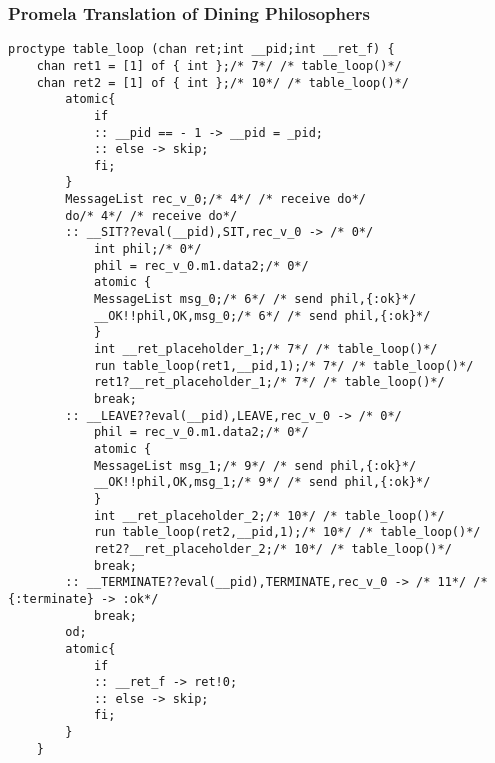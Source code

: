\subsubsection{Promela Translation of Dining Philosophers}
\begin{lstlisting}[xleftmargin=.001\linewidth, xrightmargin=0.001\linewidth, caption={Dining Philosophers Promela translation.}, label={lst:promela_dp}]
  proctype table_loop (chan ret;int __pid;int __ret_f) {
    chan ret1 = [1] of { int };/* 7*/ /* table_loop()*/ 
    chan ret2 = [1] of { int };/* 10*/ /* table_loop()*/ 
        atomic{
            if
            :: __pid == - 1 -> __pid = _pid;
            :: else -> skip;
            fi;
        }
        MessageList rec_v_0;/* 4*/ /* receive do*/ 
        do/* 4*/ /* receive do*/ 
        :: __SIT??eval(__pid),SIT,rec_v_0 -> /* 0*/ 
            int phil;/* 0*/ 
            phil = rec_v_0.m1.data2;/* 0*/ 
            atomic {
            MessageList msg_0;/* 6*/ /* send phil,{:ok}*/ 
            __OK!!phil,OK,msg_0;/* 6*/ /* send phil,{:ok}*/ 
            }
            int __ret_placeholder_1;/* 7*/ /* table_loop()*/ 
            run table_loop(ret1,__pid,1);/* 7*/ /* table_loop()*/ 
            ret1?__ret_placeholder_1;/* 7*/ /* table_loop()*/ 
            break;
        :: __LEAVE??eval(__pid),LEAVE,rec_v_0 -> /* 0*/ 
            phil = rec_v_0.m1.data2;/* 0*/ 
            atomic {
            MessageList msg_1;/* 9*/ /* send phil,{:ok}*/ 
            __OK!!phil,OK,msg_1;/* 9*/ /* send phil,{:ok}*/ 
            }
            int __ret_placeholder_2;/* 10*/ /* table_loop()*/ 
            run table_loop(ret2,__pid,1);/* 10*/ /* table_loop()*/ 
            ret2?__ret_placeholder_2;/* 10*/ /* table_loop()*/ 
            break;
        :: __TERMINATE??eval(__pid),TERMINATE,rec_v_0 -> /* 11*/ /* {:terminate} -> :ok*/ 
            break;
        od;
        atomic{
            if
            :: __ret_f -> ret!0;
            :: else -> skip;
            fi;
        }
    }
    

\end{lstlisting}
